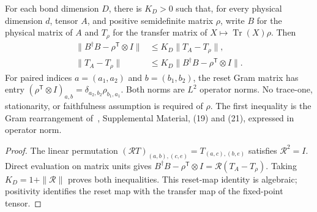 \begin{lemma}
    \label{thm:ldp_uniform_gram_transfer}
    \leanok
    For each bond dimension $D$, there is $K_D>0$ such that, for every
    physical dimension $d$, tensor $A$, and positive semidefinite matrix
    $\rho$, write $B$ for the physical matrix of $A$ and $T_\rho$ for
    the transfer matrix of $X\mapsto\operatorname{Tr}(X)\rho$. Then
    \begin{align}
        \|B^\dagger B-\rho^\mathsf T\otimes I\|
         & \le K_D\|T_A-T_\rho\|,                          \\
        \|T_A-T_\rho\|
         & \le K_D\|B^\dagger B-\rho^\mathsf T\otimes I\|.
    \end{align}
    For paired indices $a=(a_1,a_2)$ and $b=(b_1,b_2)$, the reset Gram
    matrix has entry $(\rho^\mathsf T\otimes I)_{a,b}
        =\delta_{a_2,b_2}\rho_{b_1,a_1}$.
    Both norms are $L^2$ operator norms. No trace-one, stationarity, or
    faithfulness assumption is required of $\rho$. The first inequality
    is the Gram rearrangement of~\cite{Piroli2021LOCC}, Supplemental Material,
    (19) and (21), expressed in operator norm.
\end{lemma}
\begin{proof}\leanok
    The linear permutation $(\mathcal RT)_{(a,b),(c,e)}=T_{(a,c),(b,e)}$
    satisfies $\mathcal R^2=I$. Direct evaluation on matrix units gives
    $B^\dagger B-\rho^\mathsf T\otimes I=\mathcal R(T_A-T_\rho)$.
    Taking $K_D=1+\|\mathcal R\|$ proves both inequalities.
    This reset-map identity is algebraic; positivity identifies the
    reset map with the transfer map of the fixed-point tensor.
\end{proof}

